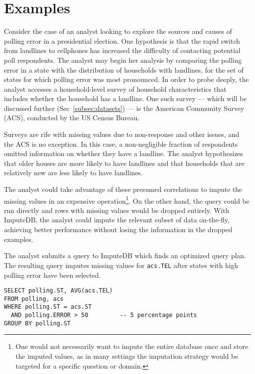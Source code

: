 \section{Examples}

Consider the case of an analyst looking to explore the sources and causes of
polling error in a presidential election. One hypothesis \cite{zukin2015s}
is that the rapid switch from landlines to cellphones has increased the
difficulty of contacting potential poll respondents. The analyst may
begin her analysis by comparing the polling error in a state with the
distribution of households with landlines, for the set of states for which
polling error was most pronounced. In order to probe deeply, the analyst
accesses a household-level survey of household characteristics that includes
whether the household has a landline. One such survey --- which will be
discussed further (Sec~\ref{subsec:datasets}) --- is the American Community Survey (ACS),
conducted by the US Census Bureau.

Surveys are rife with missing values due to non-response and other issues, and
the ACS is no exception. In this case, a non-negligible fraction of respondents omitted
information on whether they have a landline. The analyst hypothesizes that older houses are
more likely to have landlines and that households that are relatively new are less likely to
have landlines. 

The analyst could take advantage of these presumed correlations to impute the missing values
in an expensive operation\footnote{One would not necessarily want to impute the entire
database once and store the imputed values, as in many settings the imputation strategy
would be targeted for a specific question or domain.}. On the other hand, the query
could be run directly and rows with missing values would be dropped entirely. With
ImputeDB, the analyst could impute the relevant subset of data on-the-fly, achieving
better performance without losing the information in the dropped examples.

The analyst submits a query to ImputeDB which finds an optimized query plan. The resulting
query imputes missing values for \verb!acs.TEL! after states with high polling error have
been selected.

\begin{verbatim}
SELECT polling.ST, AVG(acs.TEL)
FROM polling, acs
WHERE polling.ST = acs.ST
  AND polling.ERROR > 50         -- 5 percentage points
GROUP BY polling.ST
\end{verbatim}


